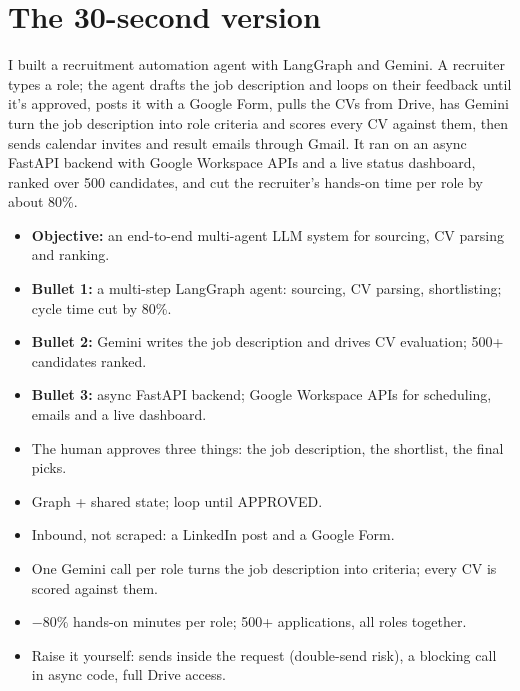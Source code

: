 \chapter{The 30-second version}
\label{ch:thirty}

\begin{sayit}
I built a recruitment automation agent with LangGraph and Gemini. A recruiter types a role; the agent drafts the job description and loops on their feedback until it's approved, posts it with a Google Form, pulls the CVs from Drive, has Gemini turn the job description into role criteria and scores every CV against them, then sends calendar invites and result emails through Gmail. It ran on an async FastAPI backend with Google Workspace APIs and a live status dashboard, ranked over 500 candidates, and cut the recruiter's hands-on time per role by about 80\%.
\end{sayit}

\begin{sayit}
\begin{itemize}
  \item \textbf{Objective:} an end-to-end multi-agent LLM system for sourcing, CV parsing and ranking.
  \item \textbf{Bullet 1:} a multi-step LangGraph agent: sourcing, CV parsing, shortlisting; cycle time cut by 80\%.
  \item \textbf{Bullet 2:} Gemini writes the job description and drives CV evaluation; 500+ candidates ranked.
  \item \textbf{Bullet 3:} async FastAPI backend; Google Workspace APIs for scheduling, emails and a live dashboard.
\end{itemize}
\end{sayit}

\begin{sayit}
\begin{itemize}
  \item The human approves three things: the job description, the shortlist, the final picks.
  \item Graph + shared state; loop until APPROVED.
  \item Inbound, not scraped: a LinkedIn post and a Google Form.
  \item One Gemini call per role turns the job description into criteria; every CV is scored against them.
  \item $-80\%$ hands-on minutes per role; 500+ applications, all roles together.
  \item Raise it yourself: sends inside the request (double-send risk), a blocking call in async code, full Drive access.
\end{itemize}
\end{sayit}

